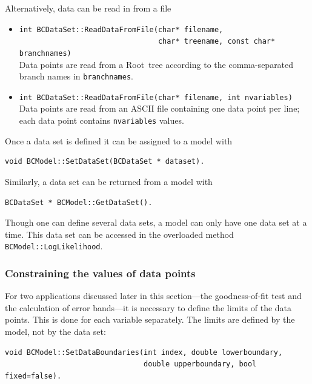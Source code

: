 \documentclass[11pt, a4paper]{article}
\newcommand{\Root}{{\sc Root}}
\newcommand{\code}[1]{\texttt{#1}}
\begin{document}
Alternatively, data can be read in from a file
%
\begin{itemize}
\item
  \verb|int BCDataSet::ReadDataFromFile(char* filename,|\\
  \verb|                                char* treename, const char* branchnames)|\\
  Data points are read from a \Root\ tree according to the
  comma-separated branch names in \code{branchnames}.

\item \code{int BCDataSet::ReadDataFromFile(char* filename, int nvariables)}\\
  Data points are read from an ASCII file containing one data point
  per line; each data point contains \code{nvariables} values.
\end{itemize}

Once a data set is defined it can be assigned to a model with
%
\begin{verbatim}
void BCModel::SetDataSet(BCDataSet * dataset).
\end{verbatim}

Similarly, a data set can be returned from a model with
%
\begin{verbatim}
BCDataSet * BCModel::GetDataSet().
\end{verbatim}

Though one can define several data sets, a model can only have one
data set at a time. This data set can be accessed in the overloaded
method \verb|BCModel::LogLikelihood|.


\subsubsection{Constraining the values of data points}

For two applications discussed later in this section---the
goodness-of-fit test and the calculation of error bands---it is
necessary to define the limits of the data points. This is done for
each variable separately. The limits are defined by the model, not by
the data set:
%
\begin{verbatim}
void BCModel::SetDataBoundaries(int index, double lowerboundary,
                                double upperboundary, bool fixed=false).
\end{verbatim}

\end{document}
